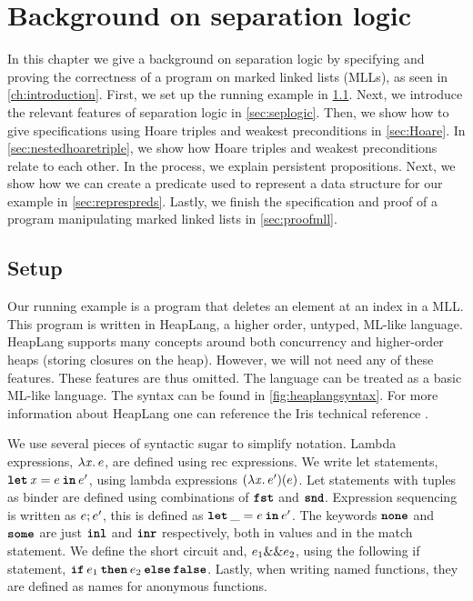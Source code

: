 \documentclass[thesis.tex]{subfiles}
\begin{document}
\chapter{Background on separation logic}
\label{ch:backgroundseplogic}

In this chapter we give a background on separation logic by specifying and proving the correctness of a program on marked linked lists (MLLs), as seen in \cref{ch:introduction}. First, we set up the running example in \cref{sec:irissetup}. Next, we introduce the relevant features of separation logic in \cref{sec:seplogic}. Then, we show how to give specifications using Hoare triples and weakest preconditions in \cref{sec:Hoare}. In \cref{sec:nestedhoaretriple}, we show how Hoare triples and weakest preconditions relate to each other. In the process, we explain persistent propositions. Next, we show how we can create a predicate used to represent a data structure for our example in \cref{sec:represpreds}. Lastly, we finish the specification and proof of a program manipulating marked linked lists in \cref{sec:proofmll}.

\section{Setup}
\label{sec:irissetup}
Our running example is a program that deletes an element at an index in a MLL. This program is written in HeapLang, a higher order, untyped, ML-like language. HeapLang supports many concepts around both concurrency and higher-order heaps (storing closures on the heap). However, we will not need any of these features. These features are thus omitted. The language can be treated as a basic ML-like language. The syntax can be found in \cref{fig:heaplangsyntax}. For more information about HeapLang one can reference the Iris technical reference \cite*{iristeamIrisReference2023}.

We use several pieces of syntactic sugar to simplify notation. Lambda expressions, $\Lam \lvar. \expr$, are defined using rec expressions. We write let statements, $\Let \lvar = \expr in \expr'$, using lambda expressions $(\Lam \lvar. \expr')(\expr)$. Let statements with tuples as binder are defined using combinations of $\operatorname{\texttt{\upshape \bfseries fst}}$ and $\operatorname{\texttt{\upshape \bfseries snd}}$. Expression sequencing is written as $e; e'$, this is defined as $\Let \_ = \expr in \expr'$. The keywords $\operatorname{\texttt{\upshape \bfseries none}}$ and $\operatorname{\texttt{\upshape \bfseries some}}$ are just $\operatorname{\texttt{\upshape \bfseries inl}}$ and $\operatorname{\texttt{\upshape \bfseries inr}}$ respectively, both in values and in the match statement. We define the short circuit and, $e_1 \&\& e_2$, using the following if statement, $\If \expr_1 then \expr_2 \Else \False$. Lastly, when writing named functions, they are defined as names for anonymous functions.
\end{document}
